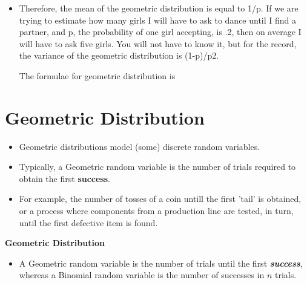 \documentclass[]{report}
\begin{document}
\begin{itemize}
\item Therefore, the mean of the geometric distribution is equal to 1/p. If we are trying to estimate how many girls I will have to ask to dance until I find a partner, and p, the probability of one girl accepting, is .2, then on average I will have to ask five girls. 
You will not have to know it, but for the record, the variance of the geometric distribution is (1-p)/p2. 


The formulae for geometric distribution is




\end{itemize}






\section{Geometric Distribution}

\begin{itemize}

\item Geometric distributions model (some) discrete random variables.
\item  Typically, a Geometric random variable is the number of trials required to obtain the first \textbf{success}.
\item For example, the number of tosses of a coin untill the first 'tail' is obtained, or a process where components from a production line are tested, in turn, until the first defective item is found.

\end{itemize}


\noindent \textbf{Geometric Distribution}

\begin{itemize}
\item A Geometric random variable is the number of trials until the first \textit{\textbf{success}}, whereas a Binomial random variable is the number of successes in $n$ trials.
\end{itemize}

\end{document}
